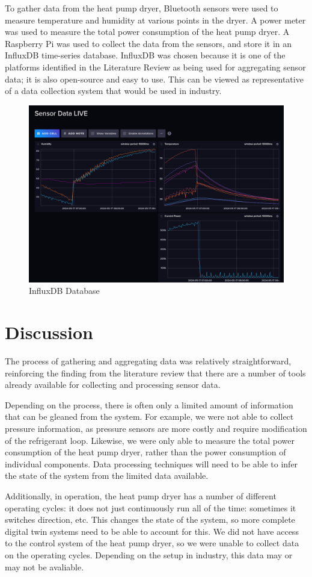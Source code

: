 To gather data from the heat pump dryer, Bluetooth sensors were used to measure temperature and humidity at various points in the dryer. 
A power meter was used to measure the total power consumption of the heat pump dryer. 
A Raspberry Pi was used to collect the data from the sensors, and store it in an InfluxDB time-series database. 
InfluxDB was chosen because it is one of the platforms identified in the Literature Review as being used for aggregating sensor data; it is also open-source and easy to use. 
This can be viewed as representative of a data collection system that would be used in industry.


\begin{figure}
    \centering
    \includegraphics[width=\textwidth]{influxdb.png}
    \caption{InfluxDB Database}
    \label{fig:influxdb}
\end{figure}

\section{Discussion}

The process of gathering and aggregating data was relatively straightforward, reinforcing the finding from the literature review that there are a number of tools already available for collecting and processing sensor data. 

Depending on the process, there is often only a limited amount of information that can be gleaned from the system. 
For example, we were not able to collect pressure information, as pressure sensors are more costly and require modification of the refrigerant loop. 
Likewise, we were only able to measure the total power consumption of the heat pump dryer, rather than the power consumption of individual components. 
Data processing techniques will need to be able to infer the state of the system from the limited data available.

Additionally, in operation, the heat pump dryer has a number of different operating cycles: it does not just continuously run all of the time: sometimes it switches direction, etc. 
This changes the state of the system, so more complete digital twin systems need to be able to account for this. 
We did not have access to the control system of the heat pump dryer, so we were unable to collect data on the operating cycles. 
Depending on the setup in industry, this data may or may not be avaliable.
